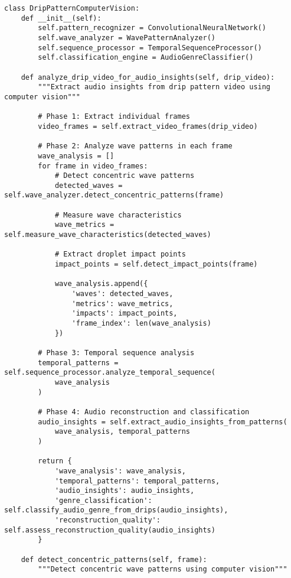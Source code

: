 \documentclass[12pt,a4paper]{article}
\begin{document}
\begin{lstlisting}[style=pythonstyle, caption=Computer Vision Drip Pattern Analysis]
class DripPatternComputerVision:
    def __init__(self):
        self.pattern_recognizer = ConvolutionalNeuralNetwork()
        self.wave_analyzer = WavePatternAnalyzer()  
        self.sequence_processor = TemporalSequenceProcessor()
        self.classification_engine = AudioGenreClassifier()
        
    def analyze_drip_video_for_audio_insights(self, drip_video):
        """Extract audio insights from drip pattern video using computer vision"""
        
        # Phase 1: Extract individual frames
        video_frames = self.extract_video_frames(drip_video)
        
        # Phase 2: Analyze wave patterns in each frame
        wave_analysis = []
        for frame in video_frames:
            # Detect concentric wave patterns
            detected_waves = self.wave_analyzer.detect_concentric_patterns(frame)
            
            # Measure wave characteristics
            wave_metrics = self.measure_wave_characteristics(detected_waves)
            
            # Extract droplet impact points
            impact_points = self.detect_impact_points(frame)
            
            wave_analysis.append({
                'waves': detected_waves,
                'metrics': wave_metrics,
                'impacts': impact_points,
                'frame_index': len(wave_analysis)
            })
        
        # Phase 3: Temporal sequence analysis
        temporal_patterns = self.sequence_processor.analyze_temporal_sequence(
            wave_analysis
        )
        
        # Phase 4: Audio reconstruction and classification
        audio_insights = self.extract_audio_insights_from_patterns(
            wave_analysis, temporal_patterns
        )
        
        return {
            'wave_analysis': wave_analysis,
            'temporal_patterns': temporal_patterns,
            'audio_insights': audio_insights,
            'genre_classification': self.classify_audio_genre_from_drips(audio_insights),
            'reconstruction_quality': self.assess_reconstruction_quality(audio_insights)
        }
    
    def detect_concentric_patterns(self, frame):
        """Detect concentric wave patterns using computer vision"""
        

\end{lstlisting}
\end{document}
